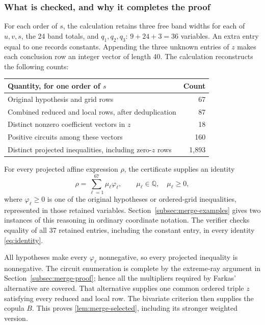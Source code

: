 \documentclass[a4paper,11pt]{amsart}
\numberwithin{equation}{section}
\theoremstyle{definition}
\theoremstyle{remark}
\begin{document}
\subsubsection{What is checked, and why it completes the proof}
For each order of $s$, the calculation retains three free band widths for each
of $u,v,s$, the 24 band totals, and $q_1,q_2,q_3$: $9+24+3=36$ variables.
An extra entry equal to one records constants. Appending the three unknown
entries of $z$ makes each conclusion row an integer vector of length 40.
The calculation reconstructs the following counts:
\begin{center}
\begin{tabular}{lr}
\toprule
Quantity, for one order of $s$ & Count\\
\midrule
Original hypothesis and grid rows & 67\\
Combined reduced and local rows, after deduplication & 87\\
Distinct nonzero coefficient vectors in $z$ & 18\\
Positive circuits among these vectors & 160\\
Distinct projected inequalities, including zero-$z$ rows & 1,893\\
\bottomrule
\end{tabular}
\end{center}
For every projected affine expression $\rho$, the certificate supplies an
identity
\begin{equation}\label{eq:identity}
 \rho=\sum_{\ell=1}^{67}\mu_\ell\varphi_\ell,
 \qquad \mu_\ell\in\mathbb Q,\quad\mu_\ell\ge0,
\end{equation}
where $\varphi_\ell\ge0$ is one of the original hypotheses or ordered-grid
inequalities, represented in those retained variables. Section~\ref{subsec:merge-examples}
gives two instances of this reasoning in ordinary coordinate notation.
The verifier checks equality of all 37 retained entries, including the
constant entry, in every identity \eqref{eq:identity}.

All hypotheses make every $\varphi_\ell$ nonnegative, so every projected
inequality is nonnegative. The circuit enumeration is complete by the
extreme-ray argument in Section~\ref{subsec:merge-proof}; hence all the multipliers
required by Farkas' alternative are covered. That alternative supplies one
common ordered triple $z$ satisfying every reduced and local row. The
bivariate criterion then supplies the copula $B$. This proves \cref{lem:merge-selected},
including its stronger weighted version.
\end{document}
